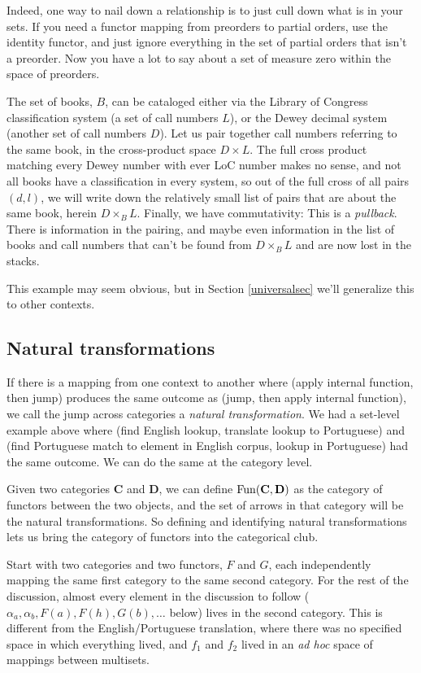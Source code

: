 \documentclass[11pt]{article}
\begin{document}
Indeed, one way to nail down a relationship is to just cull down what is in your sets.
If you need a functor mapping from preorders to partial orders, use the identity functor,
and just ignore everything in the set of partial orders that isn't a preorder. Now you
have a lot to say about a set of measure zero within the space of preorders.

The set of books, $B$, can be cataloged either via the Library of Congress classification system
(a set of call numbers $L$), or the Dewey decimal system (another set of call numbers
$D$). Let us pair together call numbers referring to the same book, in the cross-product
space $D\times L$. The full cross product matching every Dewey number with ever LoC
number makes no sense, and not all books have a classification in every system,
so out of the full cross of all pairs $(d, l)$, we will write down the relatively
small list of pairs that are about the same book, herein $D\times_B L$.  Finally,
we have commutativity:
This is a {\em pullback}. There is information in the pairing, and maybe even
information in the list of books and call numbers that can't be found from $D\times_B L$
and are now lost in the stacks.

This example may seem obvious, but in Section \ref{universalsec} we'll generalize this
to other contexts.

\subsection{Natural transformations}
If there is a mapping from one context to another where (apply internal function,
then jump) produces the same outcome as (jump, then apply internal function), we call
the jump across categories a {\em natural transformation}. We had a set-level example
above where (find English lookup, translate lookup to Portuguese) and (find Portuguese
match to element in English corpus, lookup in Portuguese) had the same outcome. We can do
the same at the category level.

Given two categories {\bf C} and {\bf D}, we can define ${\rm Fun}({\bf C}, {\bf D})$ as
the category of functors between the two objects, and the set of arrows in that category
will be the natural transformations. So defining and identifying natural
transformations lets us bring the category of functors into the categorical club.

Start with two categories and two functors, $F$ and $G$, each independently mapping the same first
category to the same second category. For the rest of the discussion, almost every element in the discussion
to follow ($\alpha_a, \alpha_b, F(a), F(h), G(b), \dots$ below) lives in the second category.
This is different from the English/Portuguese translation, where there was no specified
space in which everything lived, and $f_1$ and $f_2$ lived in an {\em ad hoc} space of
mappings between multisets.
\end{document}
